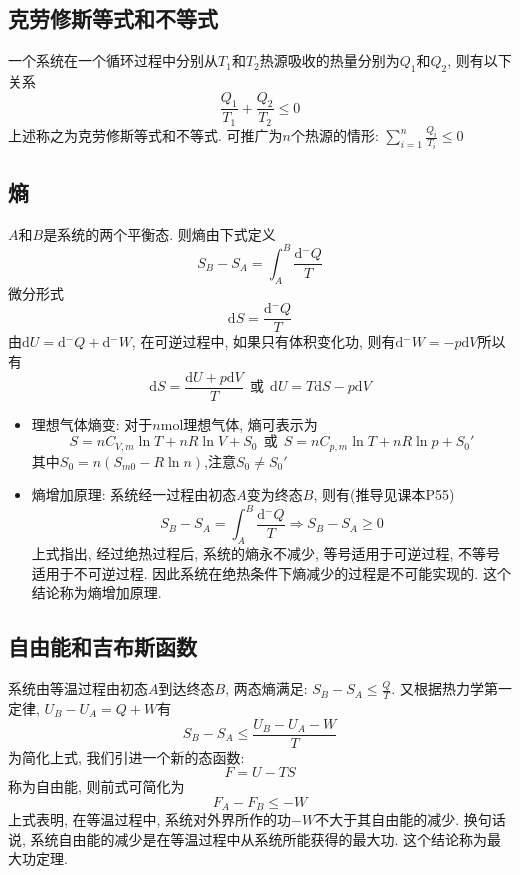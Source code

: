 \subsection{克劳修斯等式和不等式}
一个系统在一个循环过程中分别从$T_1$和$T_2$热源吸收的热量分别为$Q_1$和$Q_2$, 则有以下关系
$$
    \frac{Q_1}{T_1}+\frac{Q_2}{T_2}\leqslant 0
$$
上述称之为克劳修斯等式和不等式. 可推广为$n$个热源的情形: $\sum_{i=1}^n\frac{Q_i}{T_i}\leqslant
    0 $

\subsection{熵}
$A$和$B$是系统的两个平衡态. 则熵由下式定义
$$
    S_B-S_A=\int_A^B\frac{\mathrm{d}\!\!\!^-Q}{T}
$$
微分形式
$$
    \mathrm{d}S=\frac{\mathrm{d}\!\!\!^-Q}{T}
$$
由$\mathrm{d}U=\mathrm{d}\!\!\!^-Q+\mathrm{d}\!\!\!^-W$,
在可逆过程中, 如果只有体积变化功, 则有$\mathrm{d}\!\!\!^-W=-p\mathrm{d}V$所以有
$$
    \mathrm{d}S=\frac{\mathrm{d}U+p\mathrm{d}V}{T} \ \ \mathrm{或} \ \
    \mathrm{d}U=T\mathrm{d}S-p\mathrm{d}V
$$
\begin{itemize}
    \item 理想气体熵变: 对于$n$mol理想气体, 熵可表示为
          $$
              S=nC_{V,m}\ln T+nR\ln V+S_0 \ \ \mathrm{或} \ \ S=nC_{p,m}\ln
              T+nR\ln p+S_0'
          $$
          其中$S_0=n(S_{m0}-R\ln n)$,注意$S_0\neq S_0'$

    \item 熵增加原理: 系统经一过程由初态$A$变为终态$B$, 则有(推导见课本P55)
          $$
              S_B-S_A=\int_A^B\frac{\mathrm{d}\!\!\!^-Q}{T}\Rightarrow
              S_B-S_A\geq 0
          $$
          上式指出, 经过绝热过程后, 系统的熵永不减少, 等号适用于可逆过程, 不等号适用于不可逆过程. 因此系统在绝热条件下熵减少的过程是不可能实现的. 这个结论称为熵增加原理.
\end{itemize}

\subsection{自由能和吉布斯函数}
系统由等温过程由初态$A$到达终态$B$, 两态熵满足: $S_B-S_A\leqslant\frac{Q}{T}$. 又根据热力学第一定律, $U_B-U_A=Q+W$有
$$
    S_B-S_A\leqslant\frac{U_B-U_A-W}{T}
$$
为简化上式, 我们引进一个新的态函数:
$$F=U-TS$$
称为自由能, 则前式可简化为
$$
    F_A-F_B\leqslant-W
$$
上式表明, 在等温过程中, 系统对外界所作的功$-W$不大于其自由能的减少.
换句话说, 系统自由能的减少是在等温过程中从系统所能获得的最大功.
这个结论称为最大功定理.

